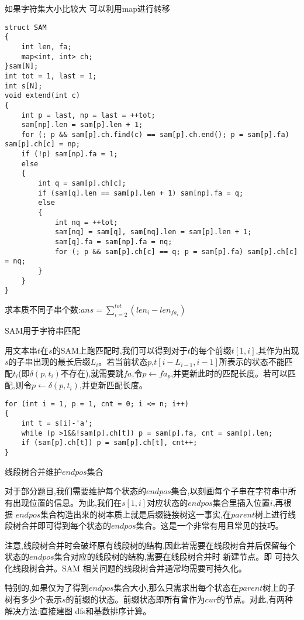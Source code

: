 \documentclass[a4paper, fontset=none]{ctexart}
\begin{document}
如果字符集大小比较大 可以利用map进行转移

\begin{verbatim}
struct SAM
{
    int len, fa;
    map<int, int> ch;
}sam[N];
int tot = 1, last = 1;
int s[N];
void extend(int c)
{
    int p = last, np = last = ++tot;
    sam[np].len = sam[p].len + 1;
    for (; p && sam[p].ch.find(c) == sam[p].ch.end(); p = sam[p].fa) sam[p].ch[c] = np;
    if (!p) sam[np].fa = 1;
    else
    {
        int q = sam[p].ch[c];
        if (sam[q].len == sam[p].len + 1) sam[np].fa = q;
        else
        {
            int nq = ++tot;
            sam[nq] = sam[q], sam[nq].len = sam[p].len + 1;
            sam[q].fa = sam[np].fa = nq;
            for (; p && sam[p].ch[c] == q; p = sam[p].fa) sam[p].ch[c] = nq;
        }
    }
}
\end{verbatim}

求本质不同子串个数:$ans=\sum\limits_{i=2}^{tot}(len_i-len_{fa_i})$

SAM用于字符串匹配

用文本串$t$在$s$的SAM上跑匹配时,我们可以得到对于$t$的每个前缀$t[1, i]$,其作为出现$s$的子串出现的最长后缀$L_i$。若当前状态$p$,$t[i-L_{i-1}, i-1]$所表示的状态不能匹配$t_i$(即$\delta(p, t_i)$不存在),就需要跳$fa$,令$p\leftarrow fa_p$,并更新此时的匹配长度。若可以匹配,则令$p\leftarrow \delta(p, t_i)$,并更新匹配长度。

\begin{verbatim}
for (int i = 1, p = 1, cnt = 0; i <= n; i++)
{
    int t = s[i]-'a';
    while (p >1&&!sam[p].ch[t]) p = sam[p].fa, cnt = sam[p].len;
    if (sam[p].ch[t]) p = sam[p].ch[t], cnt++;
}
\end{verbatim}

线段树合并维护$endpos$集合

对于部分题目,我们需要维护每个状态的$endpos$集合,以刻画每个子串在字符串中所有出现位置的信息。为此,我们在$s[1, i]$对应状态的$endpos$集合里插入位置$i$,再根据 $endpos$集合构造出来的树本质上就是后缀链接树这一事实,在$parent$树上进行线段树合并即可得到每个状态的$endpos$集合。这是一个非常有用且常见的技巧。

注意,线段树合并时会破坏原有线段树的结构,因此若需要在线段树合并后保留每个状态的$endpos$集合对应的线段树的结构,需要在线段树合并时 新建节点。即 可持久化线段树合并。SAM 相关问题的线段树合并通常均需要可持久化。

特别的,如果仅为了得到$endpos$集合大小,那么只需求出每个状态在$parent$树上的子树有多少个表示$s$的前缀的状态。前缀状态即所有曾作为$cur$的节点。对此,有两种解决方法:直接建图 dfs和基数排序计算。
\end{document}
